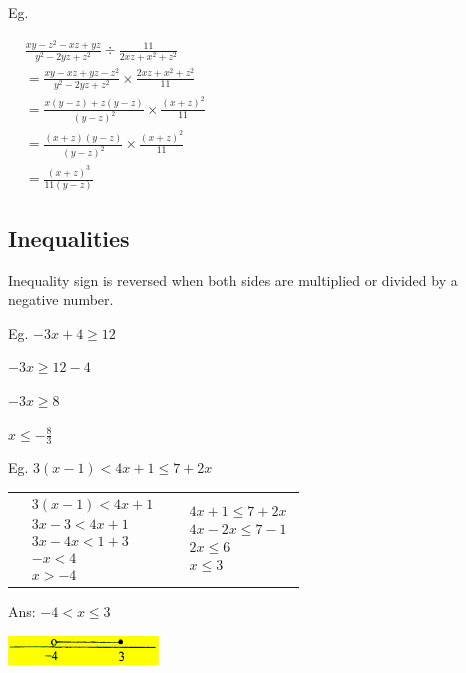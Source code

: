 \documentclass[twocolumn]{article}
\begin{document}
\noindent 
Eg. 

\noindent 
$\begin{aligned} & \frac{x y-z^2-x z+y z}{y^2-2 y z+z^2} \div \frac{11}{2 x z+x^2+z^2} \\ & =\frac{x y-x z+y z-z^2}{y^2-2 y z+z^2} \times \frac{2 x z+x^2+z^2}{11} \\ & =\frac{x(y-z)+z(y-z)}{(y-z)^2} \times \frac{(x+z)^2}{11} \\ & =\frac{(x+z)(y-z)}{(y-z)^2} \times \frac{(x+z)^2}{11} \\ & =\frac{(x+z)^3}{11(y-z)}\end{aligned}$

\subsection*{Inequalities}

\noindent 
Inequality sign is reversed when both sides are multiplied or divided by a negative number.

\bigskip 

\noindent 
Eg. $-3x + 4  \geq 12$

$-3x \geq 12-4$

$-3x \geq 8$

$x \leq - \frac{8}{3}$

\bigskip 

\noindent 
Eg. $3(x-1)<4 x+1 \leq 7+2 x$

\bigskip 
\begin{tabular}{c|c} 
$
\begin{aligned}
	& 3(x-1)<4 x+1 \\
	& 3 x-3<4 x+1 \\
	& 3 x-4 x<1+3 \\
	& -x<4 \\
	& x>-4
\end{aligned}
$
& 
$
\begin{aligned}
	& 4 x+1 \leq 7+2 x \\
	& 4 x-2 x \leq 7-1 \\
	& 2 x \leq 6 \\
	& x \leq 3
\end{aligned}
$
\end{tabular} 

\bigskip 

\noindent 
Ans: $-4 < x \leq 3$

\includegraphics[width=0.3\textwidth]{03.png}
\end{document}
